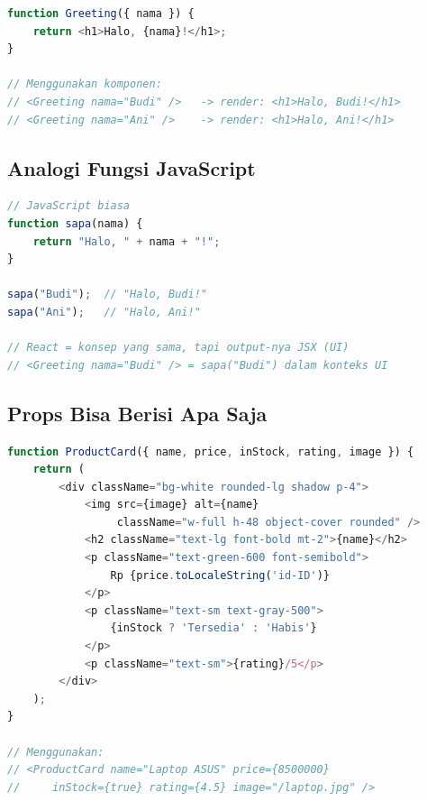 \begin{lstlisting}[language=JavaScript, caption={Props sebagai ``parameter'' komponen}, label={lst:13-props-dasar}]
function Greeting({ nama }) {
    return <h1>Halo, {nama}!</h1>;
}

// Menggunakan komponen:
// <Greeting nama="Budi" />   -> render: <h1>Halo, Budi!</h1>
// <Greeting nama="Ani" />    -> render: <h1>Halo, Ani!</h1>
\end{lstlisting}

\subsection{Analogi Fungsi JavaScript}

\begin{lstlisting}[language=JavaScript, caption={Perbandingan fungsi JS biasa dengan komponen React}, label={lst:13-analogi}]
// JavaScript biasa
function sapa(nama) {
    return "Halo, " + nama + "!";
}

sapa("Budi");  // "Halo, Budi!"
sapa("Ani");   // "Halo, Ani!"

// React = konsep yang sama, tapi output-nya JSX (UI)
// <Greeting nama="Budi" /> = sapa("Budi") dalam konteks UI
\end{lstlisting}

\subsection{Props Bisa Berisi Apa Saja}

\begin{lstlisting}[language=JavaScript, caption={\emph{Props} dengan berbagai tipe data}, label={lst:13-props-lengkap}]
function ProductCard({ name, price, inStock, rating, image }) {
    return (
        <div className="bg-white rounded-lg shadow p-4">
            <img src={image} alt={name}
                 className="w-full h-48 object-cover rounded" />
            <h2 className="text-lg font-bold mt-2">{name}</h2>
            <p className="text-green-600 font-semibold">
                Rp {price.toLocaleString('id-ID')}
            </p>
            <p className="text-sm text-gray-500">
                {inStock ? 'Tersedia' : 'Habis'}
            </p>
            <p className="text-sm">{rating}/5</p>
        </div>
    );
}

// Menggunakan:
// <ProductCard name="Laptop ASUS" price={8500000}
//     inStock={true} rating={4.5} image="/laptop.jpg" />
\end{lstlisting}

